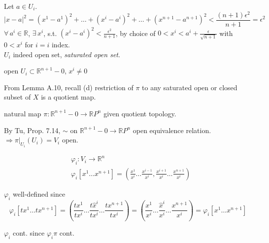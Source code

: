 Let $a\in U_i$. 
\[
|x-a|^2 = (x^1 - a^1)^2 + \dots + (x^i - a^i)^2 + \dots + (x^{n+1} - a^{n+1})^2 < \frac{ (n+1) \epsilon^2 }{ n + 1 } = \epsilon^2
\]
$\forall \, a^i \in \mathbb{R}$, $\exists \,  x^i$, s.t. $(x^i - a^i)^2 < \frac{ \epsilon^2}{ n +1}$, by choice of $0< x^i < a^i + \frac{ \epsilon}{ \sqrt{ n+ 1} }$ with $0<x^i$ for $i=i$ index.  \\
$U_i$ indeed open set, \emph{saturated open set}.  

open $U_i \subset \mathbb{R}^{n+1} - 0$, $x^i \neq 0$
 
From Lemma A.10, recall
(d) restriction of $\pi$ to any saturated open or closed subset of $X$ is a quotient map.  

natural map $\pi: \mathbb{R}^{n+1} - 0 \to \mathbb{R}P^n$ given quotient topology.  

By Tu, Prop. 7.14, $\sim $ on $\mathbb{R}^{n+1} - 0  \to \mathbb{R}P^n$ open equivalence relation.  \\
$\Longrightarrow  \left. \pi \right|_{U_i}(U_i) = V_i$ open.  

\[
\begin{aligned}
   & \varphi_i : V_i \to \mathbb{R}^n \\ 
& \varphi_i [ x^1 \dots x^{n+1} ] = \left( \frac{ x^1 }{ x^i } \dots \frac{ x^{i-1}}{ x^i } , \frac{ x^{i+1}}{ x^i} \dots \frac{x^{n+1}}{ x^i} \right)
\end{aligned}
\]

$\varphi_i$ well-defined since 
\[
\varphi_i[tx^1 \dots tx^{n+1}] = \left( \frac{ tx^1 }{ tx^i } \dots \frac{ t\widehat{x}^i }{ tx^i } \dots \frac{ tx^{n+1}}{ tx^i } \right)= \left( \frac{x^1}{ x^i } \dots \frac{ \widehat{x}^i }{ x^i } \dots \frac{ x^{n+1}}{ x^i } \right) = \varphi_i[x^1 \dots x^{n+1} ]
\]

$\varphi_i$ cont. since $\varphi_i \pi$ cont.  



